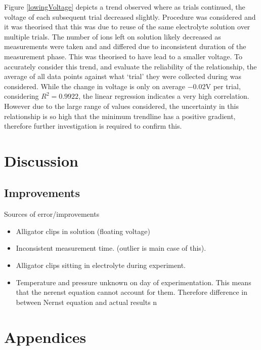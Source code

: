 \documentclass[11pt,a4paper]{article}
\begin{document}
Figure \ref{lowingVoltage} depicts a trend observed where as trials continued, the voltage of each subsequent trial decreased slightly. Procedure was considered and it was theorised that this was due to reuse of the same electrolyte solution over multiple trials. The number of ions left on solution likely decreased as measurements were taken and and differed due to inconsistent duration of the measurement phase. This was theorised to have lead to a smaller voltage. To accurately consider this trend, and evaluate the reliability of the relationship, the average of all data points against what `trial' they were collected during was considered. While the change in voltage is only on average $-0.02$V per trial, considering $R^2=0.9922$, the linear regression indicates a very high correlation. However due to the large range of values considered, the uncertainty in this relationship is so high that the minimum trendline has a positive gradient, therefore further investigation is required to confirm this. 






\section{Discussion}

\subsection{Improvements}
Sources of error/improvements

\begin{itemize}
	\item Alligator clips in solution (floating voltage)
	\item Inconsistent measurement time. (outlier is main case of this).
	\item Alligator clips sitting in electrolyte during experiment.
	\item Temperature and pressure unknown on day of experimentation. This means that the nerenst equation cannot account for them. Therefore difference in between Nernst equation and actual results n
\end{itemize}





\newpage
\section*{Appendices}
\end{document}
